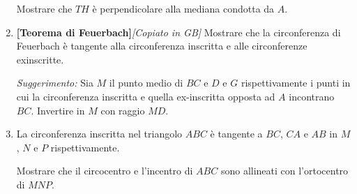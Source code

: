 \begin{enumerate}
	Mostrare che $TH$ è perpendicolare alla mediana condotta da $A$.
    \item \textbf{[Teorema di Feuerbach]}\emph{[Copiato in GB]} Mostrare che la circonferenza di Feuerbach è tangente alla circonferenza inscritta e alle circonferenze exinscritte.
    
    \emph{Suggerimento:} Sia $M$ il punto medio di $BC$ e $D$ e $G$ rispettivamente i punti in cui la circonferenza inscritta e quella ex-inscritta opposta ad $A$ incontrano $BC$. Invertire in $M$ con raggio $MD$.
    
    \item La circonferenza inscritta nel triangolo $ABC$ è tangente a $BC$, $CA$ e $AB$ in $M$, $N$ e $P$ rispettivamente. 
    
    Mostrare che il circocentro e l'incentro di $ABC$ sono allineati con l'ortocentro di $MNP$.
\end{enumerate}

